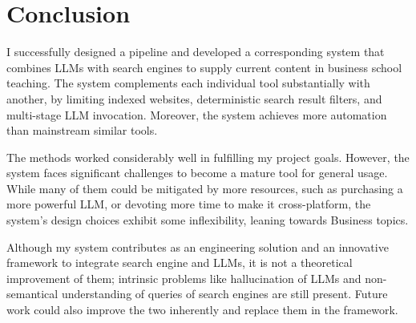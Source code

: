 \documentclass[final-report]{report-template}
\begin{document}
\section{Conclusion}
I successfully designed a pipeline and developed a corresponding system
that combines LLMs with search engines to supply current content in business
school teaching. The system complements each individual tool substantially with
another, by limiting indexed websites, deterministic search result filters, and
multi-stage LLM invocation. Moreover, the system achieves more automation than
mainstream similar tools.

The methods worked considerably well in fulfilling my project goals. However,
the system faces significant challenges to become a mature tool for general
usage. While many of them could be mitigated by more resources, such as
purchasing a more powerful LLM, or devoting more time to make it
cross-platform, the system's design choices exhibit some inflexibility, leaning
towards Business topics.

Although my system contributes as an engineering solution and an innovative
framework to integrate search engine and LLMs, it is not a theoretical
improvement of them; intrinsic problems like hallucination of LLMs and
non-semantical understanding of queries of search engines are still present.
Future work could also improve the two inherently and replace them in the
framework.

\clearpage

 

\end{document}
